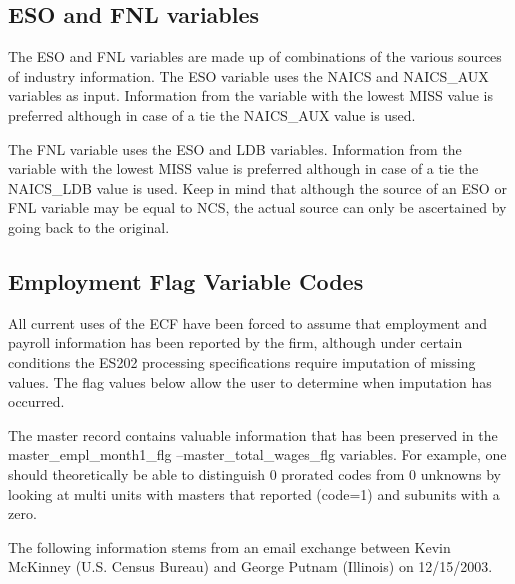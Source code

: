 \subsection{ESO and FNL variables}



The ESO and FNL variables are made up of combinations of the various sources 
of industry information. The ESO variable uses the NAICS and NAICS{\_}AUX 
variables as input. Information from the variable with the lowest MISS value 
is preferred although in case of a tie the NAICS{\_}AUX value is used.





The FNL variable uses the ESO and LDB variables. Information from the 
variable with the lowest MISS value is preferred although in case of a tie 
the NAICS{\_}LDB value is used. Keep in mind that although the source of an 
ESO or FNL variable may be equal to NCS, the actual source can only be 
ascertained by going back to the original.








\subsection{Employment Flag Variable Codes}

All current uses of the ECF have been forced to assume that employment and 
payroll information has been reported by the firm, although under certain 
conditions the ES202 processing specifications require imputation of missing 
values. The flag values below allow the user to determine when imputation 
has occurred.





The master record contains valuable information that has been preserved in 
the master{\_}empl{\_}month1{\_}flg --master{\_}total{\_}wages{\_}flg 
variables. For example, one should theoretically be able to distinguish 0 
prorated codes from 0 unknowns by looking at multi units with masters that 
reported (code=1) and subunits with a zero.





The following information stems from an email exchange between Kevin
McKinney (U.S. Census Bureau) and George Putnam (Illinois) on 12/15/2003.


